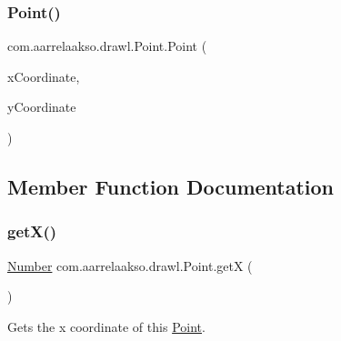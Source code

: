 \mbox{\label{classcom_1_1aarrelaakso_1_1drawl_1_1_point_acccdd3d1aeb08cc4315d415a546a3d95}} 
\subsubsection{\texorpdfstring{Point()}{Point()}\hspace{0.1cm}{\footnotesize\ttfamily [3/3]}}
{\footnotesize\ttfamily com.\+aarrelaakso.\+drawl.\+Point.\+Point (\begin{DoxyParamCaption}\item[{@Not\+Null final Double}]{x\+Coordinate,  }\item[{@Not\+Null final Double}]{y\+Coordinate }\end{DoxyParamCaption})\hspace{0.3cm}{\ttfamily [protected]}}



\subsection{Member Function Documentation}
\mbox{\label{classcom_1_1aarrelaakso_1_1drawl_1_1_point_a39d39c84f2d05c9a2551cbc584c47bfc}} 
\subsubsection{\texorpdfstring{get\+X()}{getX()}}
{\footnotesize\ttfamily \hyperlink{interfacecom_1_1aarrelaakso_1_1drawl_1_1_number}{Number} com.\+aarrelaakso.\+drawl.\+Point.\+getX (\begin{DoxyParamCaption}{ }\end{DoxyParamCaption})\hspace{0.3cm}{\ttfamily [protected]}}



Gets the x coordinate of this \hyperlink{classcom_1_1aarrelaakso_1_1drawl_1_1_point}{Point}. 

